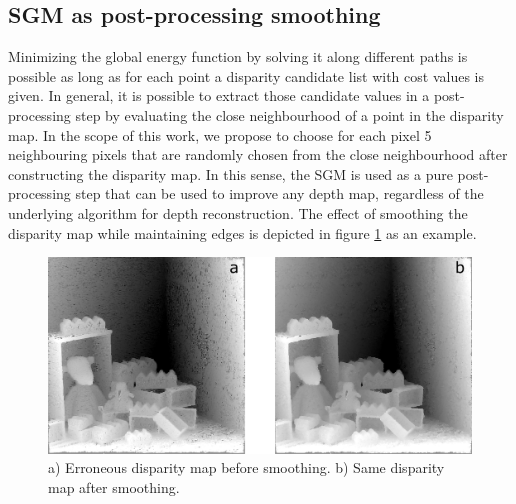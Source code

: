 \documentclass  [
  paper    = a4,
  BCOR     = 10mm,
  twoside,
  fontsize = 12pt,
  fleqn,
  toc      = bibnumbered,
  toc      = listofnumbered,
  numbers  = noendperiod,
  headings = normal,
  listof   = leveldown,
  version  = 3.03
]                                       {scrreprt}
\begin{document}
\subsection{SGM as post-processing smoothing}
\label{sec:postprocessing_smoothing}
Minimizing the global energy function by solving it along different paths is possible as long as for each point a disparity candidate list with cost values is given. In general, it is possible to extract those candidate values in a post-processing step by evaluating the close neighbourhood of a point in the disparity map. In the scope of this work, we propose to choose for each pixel 5 neighbouring pixels that are randomly chosen from the close neighbourhood after constructing the disparity map. In this sense, the SGM is used as a pure post-processing step that can be used to improve any depth map, regardless of the underlying algorithm for depth reconstruction. The effect of smoothing the disparity map while maintaining edges is depicted in figure \ref{fig:sgmpprexample} as an example.
\begin{figure}[h!]
	\centering
	\includegraphics[width=1\linewidth]{images/sgm_ppr_example}
	\caption[Example for post-processing smoothing]{a) Erroneous disparity map before smoothing. b) Same disparity map after smoothing.}
	\label{fig:sgmpprexample}
\end{figure}
\end{document}
